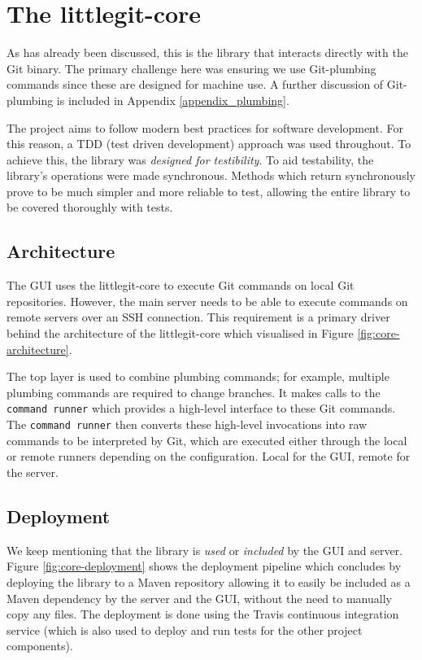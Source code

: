 \section{The littlegit-core}

As has already been discussed, this is the library that interacts directly with the Git binary. The primary challenge here was ensuring we use Git-plumbing commands since these are designed for machine use. A further discussion of Git-plumbing is included in Appendix \ref{appendix_plumbing}.

The project aims to follow modern best practices for software development. For this reason, a TDD (test driven development) approach was used throughout. To achieve this, the library was \emph{designed for testibility}. To aid testability, the library's operations were made synchronous.  Methods which return synchronously prove to be much simpler and more reliable to test, allowing the entire library to be covered thoroughly with tests.

\subsection{Architecture}\label{sec:core-architecture}

The GUI uses the littlegit-core to execute Git commands on local Git repositories. However, the main server needs to be able to execute commands on remote servers over an SSH connection. This requirement is a primary driver behind the architecture of the littlegit-core which visualised in Figure \ref{fig:core-architecture}. 

The top layer is used to combine plumbing commands; for example, multiple plumbing commands are required to change branches. It makes calls to the \texttt{command runner} which provides a high-level interface to these Git commands. The  \texttt{command runner} then converts these high-level invocations into raw commands to be interpreted by Git, which are executed either through the local or remote runners depending on the configuration. Local for the GUI, remote for the server.



\subsection{Deployment}

We keep mentioning that the library is \emph{used} or \emph{included} by the GUI and server.  Figure \ref{fig:core-deployment} shows the deployment pipeline which concludes by deploying the library to a Maven \cite{maven} repository allowing it to easily be included as a Maven dependency by the server and the GUI, without the need to manually copy any files. The deployment is done using the Travis \cite{travis} continuous integration service (which is also used to deploy and run tests for the other project components).

